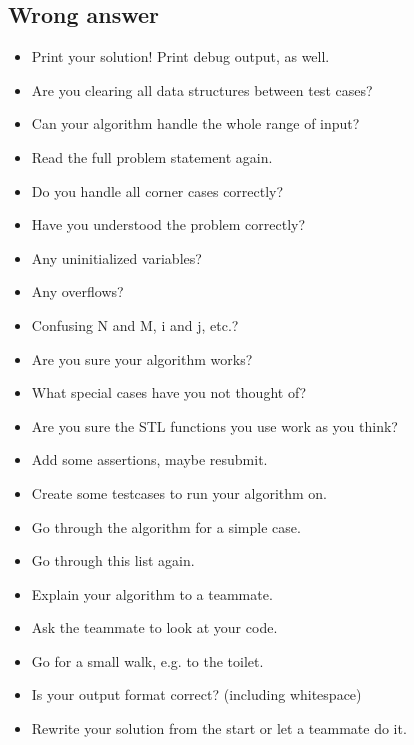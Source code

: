 \subsection{ Wrong answer }
\begin{itemize}[topsep=0pt, partopsep=0pt, itemsep=2pt, parsep=0pt, left=0pt]
   \item Print your solution! Print debug output, as well.
   \item Are you clearing all data structures between test cases?
   \item Can your algorithm handle the whole range of input?
   \item Read the full problem statement again.
   \item Do you handle all corner cases correctly?
   \item Have you understood the problem correctly?
   \item Any uninitialized variables?
   \item Any overflows?
   \item Confusing N and M, i and j, etc.?
   \item Are you sure your algorithm works?
   \item What special cases have you not thought of?
   \item Are you sure the STL functions you use work as you think?
   \item Add some assertions, maybe resubmit.
   \item Create some testcases to run your algorithm on.
   \item Go through the algorithm for a simple case.
   \item Go through this list again.
   \item Explain your algorithm to a teammate.
   \item Ask the teammate to look at your code.
   \item Go for a small walk, e.g. to the toilet.
   \item Is your output format correct? (including whitespace)
   \item Rewrite your solution from the start or let a teammate do it.
\end{itemize}

